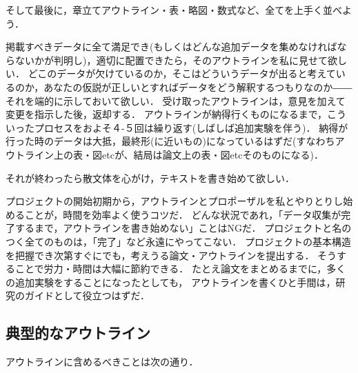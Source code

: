 \documentclass[twocolumn, 10pt,a4j]{jarticle}
\begin{document}
    そして最後に，章立てアウトライン・表・略図・数式など、全てを上手く並べよう．

    掲載すべきデータに全て満足でき(もしくはどんな追加データを集めなければならないかが判明し)，適切に配置できたら，そのアウトラインを私に見せて欲しい．
    どこのデータが欠けているのか，そこはどういうデータが出ると考えているのか，あなたの仮説が正しいとすればデータをどう解釈するつもりなのか――それを端的に示しておいて欲しい．
    受け取ったアウトラインは，意見を加えて変更を指示した後，返却する．
    アウトラインが納得行くものになるまで，こういったプロセスをおよそ４-５回は繰り返す(しばしば追加実験を伴う)．
    納得が行った時のデータは大抵，最終形(に近いもの)になっているはずだ(すなわちアウトライン上の表・図etcが、結局は論文上の表・図etcそのものになる)．

    それが終わったら散文体を心がけ，テキストを書き始めて欲しい．

    プロジェクトの開始初期から，アウトラインとプロポーザルを私とやりとりし始めることが，時間を効率よく使うコツだ．
    どんな状況であれ，「データ収集が完了するまで，アウトラインを書き始めない」ことはNGだ．
    プロジェクトと名のつく全てのものは，「完了」など永遠にやってこない．
    プロジェクトの基本構造を把握でき次第すぐにでも，考えうる論文・アウトラインを提出する．
    そうすることで労力・時間は大幅に節約できる．
    たとえ論文をまとめるまでに，多くの追加実験をすることになったとしても，
    アウトラインを書くひと手間は，研究のガイドとして役立つはずだ．

    \subsection{典型的なアウトライン}
    アウトラインに含めるべきことは次の通り．
\end{document}
